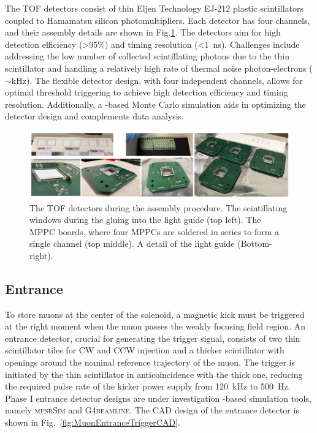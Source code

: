 \begin{refsection}
        The TOF detectors consist of thin Eljen Technology EJ-212 plastic scintillators coupled to Hamamatsu silicon photomultipliers. 
        Each detector has four channels, and their assembly details are shown in Fig.\ref{fig:muTOF_assemblyprocedure}. 
        The detectors aim for high detection efficiency (>95\%) and timing resolution (<\SI{1}{ns}). 
        Challenges include addressing the low number of collected scintillating photons due to the thin scintillator and handling a relatively high rate of thermal noise photon-electrons ($\sim$kHz). 
        The flexible detector design, with four independent channels, allows for optimal threshold triggering to achieve high detection efficiency and timing resolution.
        Additionally, a \gf-based Monte Carlo simulation aids in optimizing the detector design and complements data analysis.
        
        \begin{figure}
            \centering
            \includegraphics[width=16cm]{Figures/muEDM/muTOF_assembly.jpg}
            \caption{The TOF detectors during the assembly procedure. The scintillating windows during the gluing into the light guide (top left). The MPPC boards, where four MPPCs are soldered in series to form a single channel (top middle). A detail of the light guide (Bottom-right).}
        \label{fig:muTOF_assemblyprocedure}
        \end{figure}
        
    \subsection{Entrance}
        To store muons at the center of the solenoid, a magnetic kick must be triggered at the right moment when the muon passes the weakly focusing field region. 
        An entrance detector, crucial for generating the trigger signal, consists of two thin scintillator tiles for CW and CCW injection and a thicker scintillator with openings around the nominal reference trajectory of the muon. 
        The trigger is initiated by the thin scintillator in anticoincidence with the thick one, reducing the required pulse rate of the kicker power supply from \SI{120}{kHz} to \SI{500}{Hz}. 
        Phase I entrance detector designs are under investigation \gf-based simulation tools, namely \textsc{musrSim} and \textsc{G4beamline}. 
        The CAD design of the entrance detector is shown in Fig.~\ref{fig:MuonEntranceTriggerCAD}.


\end{refsection}
